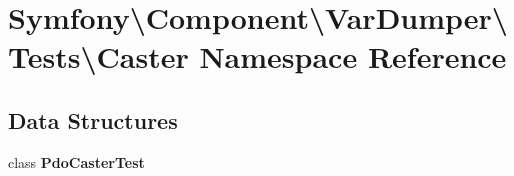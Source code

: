 \section{Symfony\textbackslash{}Component\textbackslash{}Var\+Dumper\textbackslash{}Tests\textbackslash{}Caster Namespace Reference}
\label{namespace_symfony_1_1_component_1_1_var_dumper_1_1_tests_1_1_caster}
\subsection*{Data Structures}
\begin{DoxyCompactItemize}
\item 
class {\bf Pdo\+Caster\+Test}
\end{DoxyCompactItemize}
